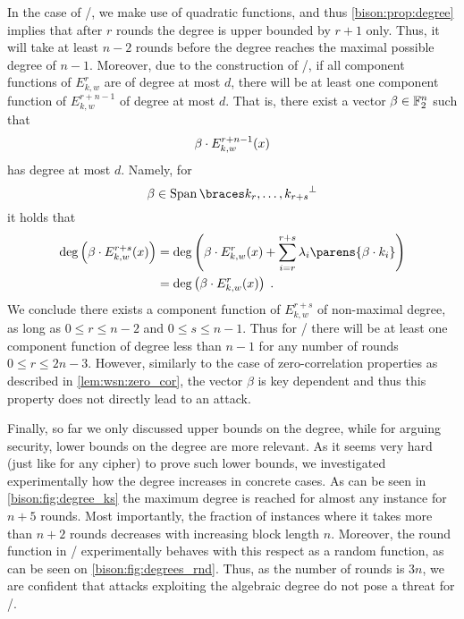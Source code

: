 In the case of \bison/, we make use of quadratic functions, and thus \cref{bison:prop:degree} implies that after $r$ rounds the degree is upper bounded by $r+1$ only.
Thus, it will take at least $n-2$ rounds before the degree reaches the maximal possible degree of $n-1$. Moreover, due to the construction of \WSN/,
if all component functions of $E_{k,w}^r$ are of degree at most $d$, there will be at least one component function of $E_{k,w}^{r+n-1}$ of degree at most $d$.
That is, there exist a vector $\beta\in\mathbb{F}_2^n$ such that
\begin{equation*}
    \beta \cdot E_{k,w}^{r+n-1}(x)
\end{equation*}
has degree at most $d$.
Namely, for
\begin{equation*}
    \beta \in \Span{k_r, \dots, k_{r+s}}^{\perp}
\end{equation*}
it holds that
\begin{align*}
    \deg\left(\iprod{\beta}{E_{k,w}^{r+s}(x)} \right)
    &= \deg\left(\iprod{\beta}{E_{k,w}^r(x)} + \sum_{i=r}^{r+s} \lambda_i \parens{\iprod{\beta}{k_i}}\right) \\
    &= \deg\left(\iprod{\beta}{E_{k,w}^r(x)}\right)\;.
\end{align*}
We conclude there exists a component function of $E_{k,w}^{r+s}$ of non-maximal degree, as long as $0 \leqslant r \leqslant n-2$ and $0\leqslant s \leqslant n-1$.
Thus for \bison/ there will be at least one component function of degree less than $n-1$ for any number of rounds $0\leqslant r\leqslant 2n-3$.
However, similarly to the case of zero-correlation properties as described in \cref{lem:wsn:zero_cor}, the vector $\beta$ is key dependent and thus this property does not directly lead to an attack.

Finally, so far we only discussed upper bounds on the degree, while for arguing security, lower bounds on the degree are more relevant.
As it seems very hard (just like for any cipher) to prove such lower bounds, we investigated experimentally how the degree increases in concrete cases.
As can be seen in \cref{bison:fig:degree_ks} the maximum degree is reached for almost any instance for $n+5$ rounds.
Most importantly, the fraction of instances where it takes more than $n+2$ rounds decreases with increasing block length $n$.
Moreover, the round function in \bison/ experimentally behaves with this respect as a random function, as can be seen on \cref{bison:fig:degrees_rnd}.
Thus, as the number of rounds is $3n$, we are confident that attacks exploiting the algebraic degree do not pose a threat for \bison/.

